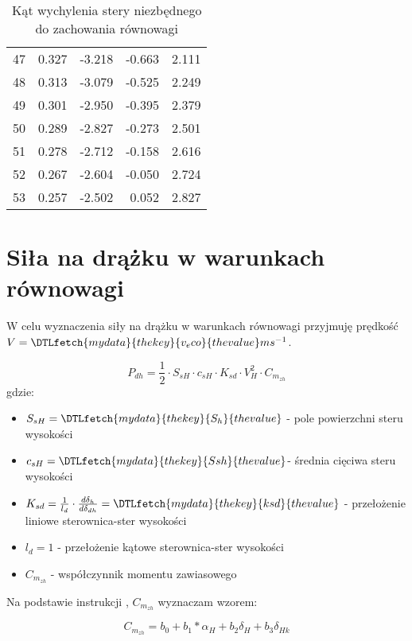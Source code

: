 \documentclass{sprawozdanie}
\newcommand{\PlaneVar}[1]{\DTLfetch{mydata}{thekey}{#1}{thevalue}}
\begin{document}
\begin{table}[h!]
\begin{tabular}{rrrrr}
        47  &  0.327 &    -3.218 &    -0.663 &     2.111 \\
        48  &  0.313 &    -3.079 &    -0.525 &     2.249 \\
        49  &  0.301 &    -2.950 &    -0.395 &     2.379 \\
        50  &  0.289 &    -2.827 &    -0.273 &     2.501 \\
        51  &  0.278 &    -2.712 &    -0.158 &     2.616 \\
        52  &  0.267 &    -2.604 &    -0.050 &     2.724 \\
        53  &  0.257 &    -2.502 &     0.052 &     2.827 \\
        \bottomrule
        \end{tabular}
    \caption{Kąt wychylenia stery niezbędnego do zachowania równowagi}
    \label{tab:deltahv}
\end{table}
\FloatBarrier


\section{Siła na drążku w warunkach równowagi}
W celu wyznaczenia siły na drążku w warunkach równowagi przyjmuję prędkość $V = \PlaneVar{v_eco} ms^{-1}$.

\begin{equation}
    \label{eq:pdh}
    P_{dh} = \frac{1}{2}\cdot S_{sH}\cdot c_{sH} \cdot K_{sd} \cdot  V_H^2 \cdot C_{m_{zh}}
\end{equation}
gdzie:
\begin{itemize}
    \item $S_{sH} = \PlaneVar{S_h}$ - pole powierzchni steru wysokości
    \item $c_{sH} = \PlaneVar{Ssh}$- średnia cięciwa steru wysokości
    \item $K_{sd} = \frac{1}{l_d} \cdot \frac{d \delta_h}{d \delta_{dh}} = \PlaneVar{ksd}$ - przełożenie liniowe sterownica-ster wysokości
    \item $l_d = 1$ - przełożenie kątowe sterownica-ster wysokości
    \item $C_{m_{zh}}$ - współczynnik momentu zawiasowego
\end{itemize}

Na podstawie instrukcji \cite{Instrukcja9}, $C_{m_{zh}}$ wyznaczam wzorem:

\begin{equation}
    C_{m_{zh}}=b_0 + b_1*\alpha_H + b_2\delta_H+b_3\delta_{Hk}
\end{equation}
\end{document}
